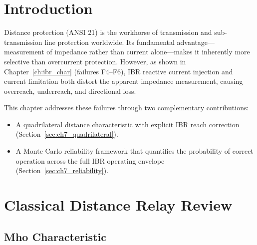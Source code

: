 
\section{Introduction}
\label{sec:ch7_intro}

Distance protection (ANSI 21) is the workhorse of transmission and
sub-transmission line protection worldwide. Its fundamental advantage—
measurement of impedance rather than current alone—makes it inherently
more selective than overcurrent protection. However, as shown in
Chapter~\ref{ch:ibr_char} (failures F4--F6), IBR reactive current
injection and current limitation both distort the apparent impedance
measurement, causing overreach, underreach, and directional loss.

This chapter addresses these failures through two complementary contributions:
\begin{itemize}
\item A quadrilateral distance characteristic with explicit
      IBR reach correction (Section~\ref{sec:ch7_quadrilateral}).
\item A Monte Carlo reliability framework that quantifies
      the probability of correct operation across the full
      IBR operating envelope (Section~\ref{sec:ch7_reliability}).
\end{itemize}

\section{Classical Distance Relay Review}
\label{sec:ch7_review}

\subsection{Mho Characteristic}

